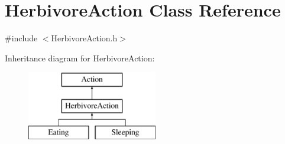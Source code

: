 \hypertarget{class_herbivore_action}{}\section{Herbivore\+Action Class Reference}
\label{class_herbivore_action}


{\ttfamily \#include $<$Herbivore\+Action.\+h$>$}

Inheritance diagram for Herbivore\+Action\+:\begin{figure}[H]
\begin{center}
\leavevmode
\includegraphics[height=3.000000cm]{class_herbivore_action}
\end{center}
\end{figure}
